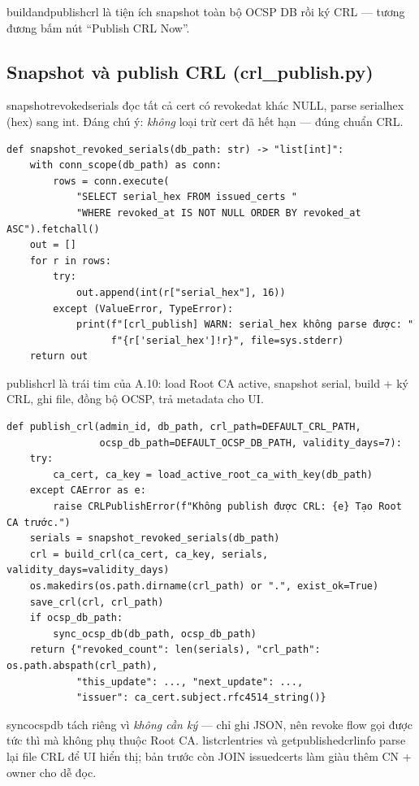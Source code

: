 \documentclass[12pt,a4paper]{article}
\newcommand{\code}[1]{{\ttfamily\small\def\_{\textunderscore\discretionary{}{}{}}#1}}
\begin{document}
\code{build\_and\_publish\_crl} là tiện ích snapshot toàn bộ OCSP DB rồi ký CRL
--- tương đương bấm nút ``Publish CRL Now''.

\subsection{Snapshot và publish CRL (crl\_publish.py)}

\code{snapshot\_revoked\_serials} đọc tất cả cert có \code{revoked\_at} khác
NULL, parse \code{serial\_hex} (hex) sang int. Đáng chú ý: \emph{không} loại trừ
cert đã hết hạn --- đúng chuẩn CRL.

\begin{Verbatim}
def snapshot_revoked_serials(db_path: str) -> "list[int]":
    with conn_scope(db_path) as conn:
        rows = conn.execute(
            "SELECT serial_hex FROM issued_certs "
            "WHERE revoked_at IS NOT NULL ORDER BY revoked_at ASC").fetchall()
    out = []
    for r in rows:
        try:
            out.append(int(r["serial_hex"], 16))
        except (ValueError, TypeError):
            print(f"[crl_publish] WARN: serial_hex không parse được: "
                  f"{r['serial_hex']!r}", file=sys.stderr)
    return out
\end{Verbatim}

\code{publish\_crl} là trái tim của A.10: load Root CA active, snapshot serial,
build + ký CRL, ghi file, đồng bộ OCSP, trả metadata cho UI.

\begin{Verbatim}
def publish_crl(admin_id, db_path, crl_path=DEFAULT_CRL_PATH,
                ocsp_db_path=DEFAULT_OCSP_DB_PATH, validity_days=7):
    try:
        ca_cert, ca_key = load_active_root_ca_with_key(db_path)
    except CAError as e:
        raise CRLPublishError(f"Không publish được CRL: {e} Tạo Root CA trước.")
    serials = snapshot_revoked_serials(db_path)
    crl = build_crl(ca_cert, ca_key, serials, validity_days=validity_days)
    os.makedirs(os.path.dirname(crl_path) or ".", exist_ok=True)
    save_crl(crl, crl_path)
    if ocsp_db_path:
        sync_ocsp_db(db_path, ocsp_db_path)
    return {"revoked_count": len(serials), "crl_path": os.path.abspath(crl_path),
            "this_update": ..., "next_update": ...,
            "issuer": ca_cert.subject.rfc4514_string()}
\end{Verbatim}

\code{sync\_ocsp\_db} tách riêng vì \emph{không cần ký} --- chỉ ghi JSON, nên
revoke flow gọi được tức thì mà không phụ thuộc Root CA. \code{list\_crl\_entries}
và \code{get\_published\_crl\_info} parse lại file CRL để UI hiển thị; bản trước
còn JOIN \code{issued\_certs} làm giàu thêm CN + owner cho dễ đọc.
\end{document}
